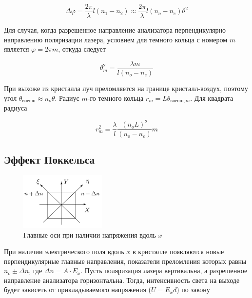 \documentclass{article}
\begin{document}
\begin{equation}
    \Delta \varphi = \frac{2\pi}{\lambda} l (n_1 - n_2) \approx
    \frac{2\pi}{\lambda} l (n_o - n_e) \theta^2
    \label{eq:raznost_faz}
\end{equation}

Для случая, когда разрешенное направление анализатора перпендикулярно направлению
поляризации лазера, условием для темного кольца с номером $m$ является
$\varphi = 2\pi m$, откуда следует

\begin{equation}
    \theta_m^2 = \frac{\lambda m}{l(n_o - n_e)}
    \label{eq:theta_m}
\end{equation}

При выхоже из кристалла луч преломляется на границе кристалл-воздух, поэтому угол
$\theta_{внешн} \approx n_o \theta$. Радиус $m$-го темного кольца
$r_m = L\theta_{внешн, m}$. Для квадрата радиуса

\begin{equation}
    r_m^2 = \frac{\lambda}{l} \frac{{(n_o L)}^2}{(n_o - n_e)} m
    \label{eq:r_m}
\end{equation}

\newpage
\subsection{Эффект Поккельса}

\begin{figure}
  \begin{center}
    \includegraphics[width=0.38\textwidth]{pokkels_axes.png}
  \end{center}
  \caption{Главные оси при наличии напряжения вдоль $x$}\label{fig:pokkels_axes}
\end{figure}

При наличии электрического поля вдоль $x$ в кристалле появляются новые перпендикулярные
главные направления, показатели преломления которых равны $n_o \pm \Delta n$, где
$\Delta n = A \cdot E_{x}$. Пусть поляризация лазера вертикальна, а разрешенное
направление анализатора горизонтальна. Тогда, интенсивность света на выходе
будет зависеть от прикладываемого напряжения ($U = E_x d$) по закону
\end{document}
